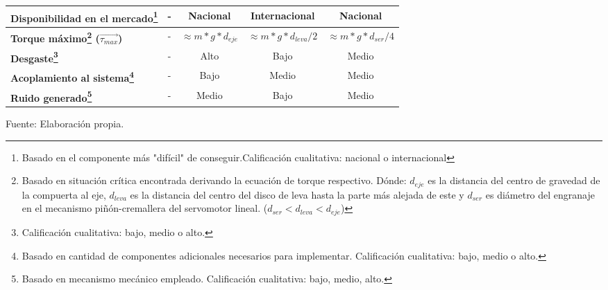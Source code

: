 \begin{itemize}
\begin{savenotes}
\begin{mytable}[H]
\begin{tabular}{l|c|c|c|c|}
{					\begin{minipage}{\myforthmaxsizeofcontenttable}			
						\textbf{Disponibilidad en el mercado\footnote{Basado en el componente más "difícil" de conseguir.Calificación cualitativa: nacional o internacional}}
					\end{minipage}
				} & - & Nacional & Internacional & Nacional \\ \hline
				\multicolumn{1}{|l|}{
					\begin{minipage}{\myforthmaxsizeofcontenttable}			
						\textbf{Torque máximo\footnote{Basado en situación crítica encontrada derivando la ecuación de torque respectivo. Dónde: $d_{eje}$ es la distancia del centro de gravedad de la compuerta al eje, $d_{leva}$ es la distancia del centro del disco de leva hasta la parte más alejada de este y $d_{ser}$ es diámetro del engranaje en el mecanismo piñón-cremallera del servomotor lineal. ($d_{ser}<d_{leva}<d_{eje}$)} ($\overrightarrow{\tau_{max}}$)}	
					\end{minipage}
				} & - & $\approx m*g*d_{eje}$ & $\approx m*g*d_{leva}/2$ & $\approx m*g*d_{ser}/4$ \\ \hline
				\multicolumn{1}{|l|}{
					\begin{minipage}{\myforthmaxsizeofcontenttable}			
						\textbf{Desgaste\footnote{Calificación cualitativa: bajo, medio o alto.}}
					\end{minipage}
				} & - & Alto & Bajo & Medio \\ \hline
				\multicolumn{1}{|l|}{
					\begin{minipage}{\myforthmaxsizeofcontenttable}			
						\textbf{Acoplamiento al sistema\footnote{Basado en cantidad de componentes adicionales necesarios para implementar. Calificación cualitativa: bajo, medio o alto.}}
					\end{minipage}
				} & - & Bajo & Medio & Medio \\ \hline
				\multicolumn{1}{|l|}{
					\begin{minipage}{\myforthmaxsizeofcontenttable}			
						\textbf{Ruido generado\footnote{Basado en mecanismo mecánico empleado. Calificación cualitativa: bajo, medio, alto.}}
					\end{minipage}
				} & - & Medio & Bajo & Medio \\ \hline
			\end{tabular}
			\begin{flushleft}	
				Fuente: Elaboración propia.
			\end{flushleft}
		\end{mytable}
	\end{savenotes}	
	

\end{itemize}
